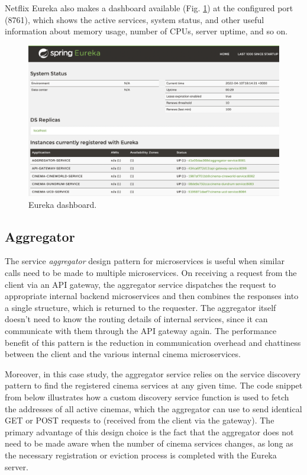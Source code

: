 Netflix Eureka also makes a dashboard available (Fig. \ref{fig:eureka-dashboard}) at the configured port (8761), which shows the active services, system status, and other useful information about memory usage, number of CPUs, server uptime, and so on.

\begin{figure}[H]
  \centering
  \includegraphics[width=1.0\linewidth]{./assets/images/case-study-01/eureka-dashboard.png}
  \caption{Eureka dashboard.}
  \label{fig:eureka-dashboard}
\end{figure}

\subsection{Aggregator}

The service \textit{aggregator} design pattern for microservices is useful when similar calls need to be made to multiple microservices. On receiving a request from the client via an API gateway, the aggregator service dispatches the request to appropriate internal backend microservices and then combines the responses into a single structure, which is returned to the requester. The aggregator itself doesn't need to know the routing details of internal services, since it can communicate with them through the API gateway again. The performance benefit of this pattern is the reduction in communication overhead and chattiness between the client and the various internal cinema microservices.

Moreover, in this case study, the aggregator service relies on the service discovery pattern to find the registered cinema services at any given time. The code snippet from  below illustrates how a custom discovery service function is used to fetch the addresses of all active cinemas, which the aggregator can use to send identical GET or POST requests to (received from the client via the gateway). The primary advantage of this design choice is the fact that the aggregator does not need to be made aware when the number of cinema services changes, as long as the necessary registration or eviction process is completed with the Eureka server.


